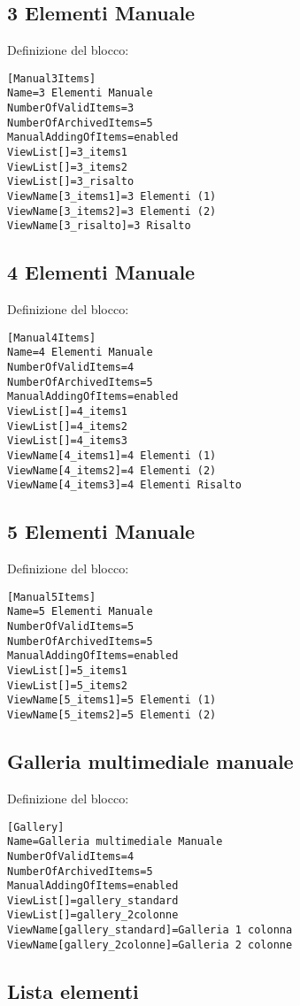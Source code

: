 \subsection{3 Elementi Manuale}
Definizione del blocco:
\begin{verbatim}
[Manual3Items]
Name=3 Elementi Manuale
NumberOfValidItems=3
NumberOfArchivedItems=5
ManualAddingOfItems=enabled
ViewList[]=3_items1
ViewList[]=3_items2
ViewList[]=3_risalto
ViewName[3_items1]=3 Elementi (1)
ViewName[3_items2]=3 Elementi (2)
ViewName[3_risalto]=3 Risalto
\end{verbatim}

\subsection{4 Elementi Manuale}

Definizione del blocco:
\begin{verbatim}
[Manual4Items]
Name=4 Elementi Manuale
NumberOfValidItems=4
NumberOfArchivedItems=5
ManualAddingOfItems=enabled
ViewList[]=4_items1
ViewList[]=4_items2
ViewList[]=4_items3
ViewName[4_items1]=4 Elementi (1)
ViewName[4_items2]=4 Elementi (2)
ViewName[4_items3]=4 Elementi Risalto
\end{verbatim}
\subsection{5 Elementi Manuale}

Definizione del blocco:
\begin{verbatim}
[Manual5Items]
Name=5 Elementi Manuale
NumberOfValidItems=5
NumberOfArchivedItems=5
ManualAddingOfItems=enabled
ViewList[]=5_items1
ViewList[]=5_items2
ViewName[5_items1]=5 Elementi (1)
ViewName[5_items2]=5 Elementi (2)
\end{verbatim}
\subsection{Galleria multimediale manuale}
Definizione del blocco:
\begin{verbatim}
[Gallery]
Name=Galleria multimediale Manuale
NumberOfValidItems=4
NumberOfArchivedItems=5
ManualAddingOfItems=enabled
ViewList[]=gallery_standard
ViewList[]=gallery_2colonne
ViewName[gallery_standard]=Galleria 1 colonna
ViewName[gallery_2colonne]=Galleria 2 colonne
\end{verbatim}
\subsection{Lista elementi}


